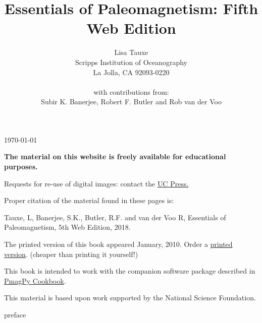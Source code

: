 \documentclass[11pt]{book}
\begin{document}
  \newcommand{\be}{\begin{equation}}%
\newcommand{\ee}{\end{equation}}%

 
 
 \title{Essentials of  Paleomagnetism: Fifth Web Edition}
 \author{Lisa Tauxe\\Scripps Institution of Oceanography\\La Jolla, CA 92093-0220\\ \\
  with contributions from: \\ Subir K. Banerjee, Robert F. Butler and Rob van der Voo}
  \today
 \maketitle
 
{\bf The material on this website is freely available for educational purposes. }

Requests for re-use of digital images: contact the \href{http://http://www.ucpress.edu}{UC Press.}

Proper citation of the material found in these pages is: 

Tauxe, L, Banerjee, S.K., Butler, R.F. and van der Voo R, Essentials of Paleomagnetism, 5th Web Edition, 2018. 

The printed version of this book appeared January, 2010. Order a \href{http://www.ucpress.edu/books/pages/11183.php}{printed version}. (cheaper than printing it yourself!)



This book is intended to work with the companion software package described in \href{http://earthref.org/PmagPy/cookbook/}{PmagPy Cookbook}.   

This material is based upon work supported by the National Science Foundation.

\setcounter{page}{1}
 {preface}
\setcounter{tocdepth}{3}
\tableofcontents
\clearpage
{}
\setcounter{page}{1}






\end{document}
